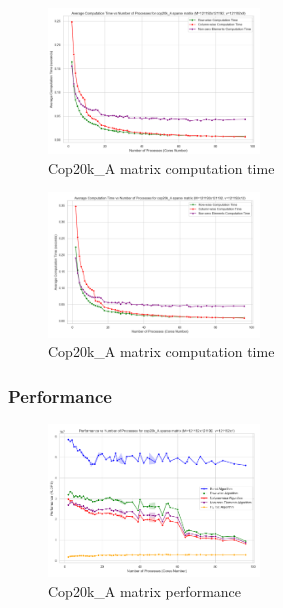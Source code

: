 \documentclass[12pt,oneside]{book} %
\begin{document}
\begin{figure}[H]
    \centering
    \includegraphics[width=0.5\textwidth]{../results/fat_vector_dim/cop20k_A_k9_computation_time.png}
    \caption{Cop20k\_A matrix computation time}\label{fig:cop20k-a-k9-computation-time}
\end{figure}

\begin{figure}[H]
    \centering
    \includegraphics[width=0.5\textwidth]{../results/fat_vector_dim/cop20k_A_k12_computation_time.png}
    \caption{Cop20k\_A matrix computation time}\label{fig:cop20k-a-k12-computation-time}
\end{figure}

\subsubsection{Performance}

\begin{figure}[H]
    \centering
    \includegraphics[width=0.5\textwidth]{../results/fat_vector_dim/cop20k_A_k1_performance.png}
    \caption{Cop20k\_A matrix performance}\label{fig:cop20k-a-k1-performance}
\end{figure}
\end{document}
